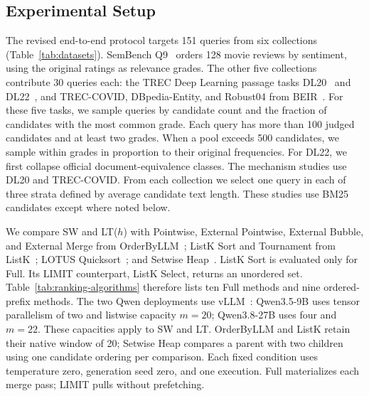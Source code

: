 \subsection{Experimental Setup}
\label{sec:exp:setup}

The revised end-to-end protocol targets 151 queries from six collections (Table~\ref{tab:datasets}).
SemBench Q9~\cite{lao2026sembench} orders 128 movie reviews by sentiment, using the original ratings as relevance grades.
The other five collections contribute 30 queries each: the TREC Deep Learning passage tasks DL20~\cite{arxiv21trecdl20} and DL22~\cite{arxiv25trecdl22}, and TREC-COVID, DBpedia-Entity, and Robust04 from BEIR~\cite{arxiv21BEIR}.
For these five tasks, we sample queries by candidate count and the fraction of candidates with the most common grade.
Each query has more than 100 judged candidates and at least two grades. When a pool exceeds 500 candidates, we sample within grades in proportion to their original frequencies. For DL22, we first collapse official document-equivalence classes.
The mechanism studies use DL20 and TREC-COVID. From each collection we select one query in each of three strata defined by average candidate text length. These studies use BM25 candidates except where noted below.

We compare SW and LT($h$) with Pointwise, External Pointwise, External Bubble, and External Merge from OrderByLLM~\cite{DBLP:journals/corr/abs-2509-00303}; ListK Sort and Tournament from ListK~\cite{DBLP:journals/corr/abs-2603-17223}; LOTUS Quicksort~\cite{DBLP:journals/pvldb/PatelJPGAGZ25}; and Setwise Heap~\cite{DBLP:conf/sigir/ZhuangZKZ24}.
ListK Sort is evaluated only for Full. Its \textsf{LIMIT} counterpart, ListK Select, returns an unordered set. Table~\ref{tab:ranking-algorithms} therefore lists ten Full methods and nine ordered-prefix methods.
The two Qwen deployments use vLLM~\cite{kwon2023efficient}: Qwen3.5-9B uses tensor parallelism of two and listwise capacity $m=20$; Qwen3.8-27B uses four and $m=22$. These capacities apply to SW and LT. OrderByLLM and ListK retain their native window of 20; Setwise Heap compares a parent with two children using one candidate ordering per comparison.
Each fixed condition uses temperature zero, generation seed zero, and one execution. Full materializes each merge pass; \textsf{LIMIT} pulls without prefetching.

